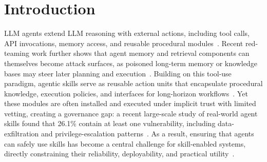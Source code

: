 \documentclass{article}
\begin{document}
\section{Introduction}


LLM agents extend LLM reasoning with external actions, including tool calls, API invocations, memory access, and reusable procedural modules~\citep{yao2023react,schick2023toolformer,qin2024toollm,patil2024gorilla}. Recent red-teaming work further shows that agent memory and retrieval components can themselves become attack surfaces, as poisoned long-term memory or knowledge bases may steer later planning and execution~\citep{chen2024agentpoison}. Building on this tool-use paradigm, agentic skills serve as reusable action units that encapsulate procedural knowledge, execution policies, and interfaces for long-horizon workflows~\citep{jiang2026sokagenticskills}. Yet these modules are often installed and executed under implicit trust with limited vetting, creating a governance gap: a recent large-scale study of real-world agent skills found that 26.1\% contain at least one vulnerability, including data-exfiltration and privilege-escalation patterns~\citep{liu2026donotmentionmaliciousskills}. As a result, ensuring that agents can safely use skills has become a central challenge for skill-enabled systems, directly constraining their reliability, deployability, and practical utility~\citep{bhardwaj2026formalanalysis}.

\end{document}
